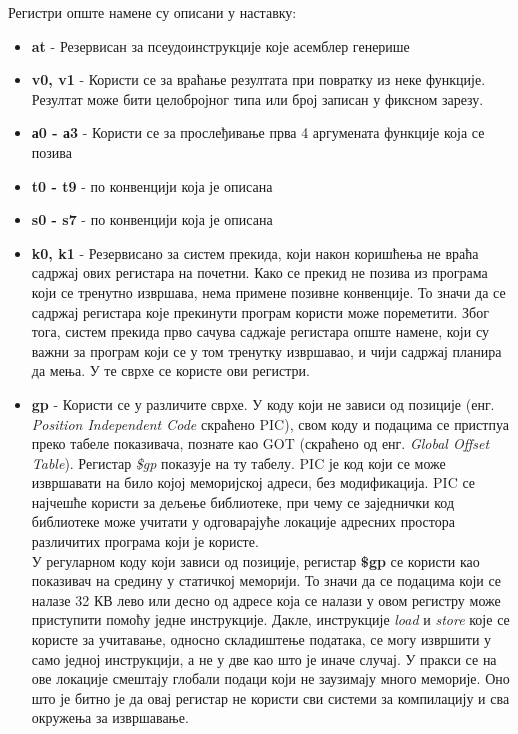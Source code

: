\documentclass[12pt,oneside]{memoir}
\begin{document}
Регистри опште намене су описани у наставку:
\begin{itemize}
  \item \textbf{at} - Резервисан за псеудоинструкције које асемблер генерише
  \item \textbf{v0, v1} - Користи се за враћање резултата при повратку из неке функције. Резултат може бити целобројног типа или број записан у фиксном зарезу.
  \item \textbf{а0 - а3} - Користи се за прослеђивање прва 4 аргумената функције која се позива
  \item \textbf{t0 - t9} - по конвенцији која је описана 
  \item \textbf{s0 - s7} - по конвенцији која је описана 
  \item \textbf{k0, k1} - Резервисано за систем прекида, који након коришћења не враћа садржај ових регистара на почетни. Како се прекид не позива из програма који се тренутно извршава, нема примене позивне конвенције. То значи да се садржај регистара које прекинути програм користи може пореметити. Због тога, систем прекида прво сачува саджаје регистара опште намене, који су важни за програм који се у том тренутку извршавао, и чији садржај планира да мења. У те сврхе се користе ови регистри.
  \item \textbf{gp} - Користи се у различите сврхе. У коду који  не зависи од позиције (енг. \textit{Position Independent Code} скраћено PIC), свом коду и подацима се пристпуа преко табеле показивача, познате као GOT (скраћено од енг. \textit{Global Offset Table}). Регистар \textit{\$gp} показује на ту табелу. PIC је код који се може извршавати на било којој меморијској адреси, без модификација. PIC се најчешће користи за дељење библиотеке, при чему се заједнички код библиотеке може учитати у одговарајуће локације адресних простора различитих програма који је користе. \\
  У регуларном коду који зависи од позиције, регистар \textbf{\$gp} се користи као показивач на средину у статичкој меморији. То значи да се подацима који се налазе 32 КВ лево или десно од адресе која се налази у овом регистру може приступити помоћу једне инструкције. Дакле, инструкције \textit{load} и \textit{store} које се користе за учитавање, односно складиштење података, се могу извршити у само једној инструкцији, а не у две као што је иначе случај. У пракси се на ове локације смештају глобали подаци који не заузимају много меморије. Оно што је битно је да овај регистар не користи сви системи за компилацију и сва окружења за извршавање.
  

\end{itemize}
\end{document}
